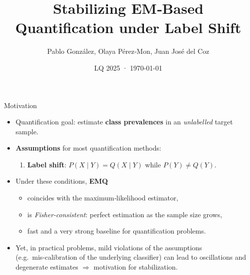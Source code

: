\documentclass[aspectratio=169]{beamer}
\title[Stabilizing EM‑Based Quantification]{Stabilizing EM‑Based Quantification under Label Shift}
\author{Pablo González, Olaya Pérez‑Mon, Juan José del Coz}
\institute[AI Center, Uni. Oviedo]{Artificial Intelligence Center\\University of Oviedo}
\date{LQ 2025 · \today}
\begin{document}
\begin{frame}
  \titlepage
\end{frame}

\begin{frame}{Motivation}
  \begin{itemize}
    \item \alert{Quantification goal}: estimate \textbf{class prevalences} in an \emph{unlabelled} target sample.
    \item \textbf{Assumptions} for most quantification methods:
          \begin{enumerate}
            \item \textbf{Label shift}: $P(X\mid Y)=Q(X\mid Y)$ while $P(Y)\neq Q(Y)$.
          \end{enumerate}
    \item Under these conditions,  \textbf{EMQ}
          \begin{itemize}
            \item coincides with the maximum‑likelihood estimator,
            \item is \emph{Fisher‑consistent}: perfect estimation as the sample size grows,
            \item fast and a very strong baseline for quantification problems.
          \end{itemize}
    \item Yet, in practical problems, mild violations of the assumptions (e.g.\ mis‑calibration of the underlying classifier) can lead to oscillations and degenerate estimates $\Rightarrow$ motivation for stabilization.
  \end{itemize}
\end{frame}
\end{document}
